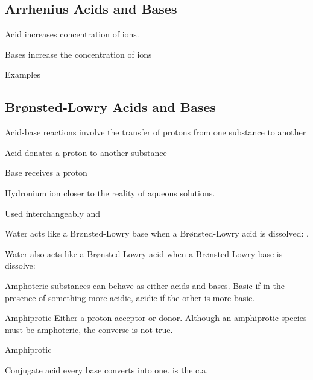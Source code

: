 \begin{mdframed}
\begin{multicols}{2}
\subsection{Arrhenius Acids and Bases}
\begin{compactdesc}
    \item[Acid] increases concentration of  ions.
    \item[Bases] increase the concentration of  ions
    \item[Examples] 
                 \\ 
\end{compactdesc}

\subsection{Br{\o}nsted-Lowry Acids and Bases}
\begin{compactdesc}
    \item[Acid-base reactions] involve the transfer of protons from one
        substance to another
    \item[Acid] donates a proton to another substance
    \item[Base] receives a proton
    \item[Hydronium ion] closer to the reality of aqueous solutions.
    \item[Used interchangeably]  and 
    \item[Water acts like] a Br{\o}nsted-Lowry base when a Br{\o}nsted-Lowry
        acid is dissolved:
        .
    \item[Water also acts like] a Br{\o}nsted-Lowry acid when a
        Br{\o}nsted-Lowry base is dissolve:
    \item[Amphoteric] substances can behave as either acids and bases.
        Basic if in the presence of something more acidic, acidic if the other
        is more basic.
    \item[Amphiprotic] Either a proton acceptor or donor. Although an
        amphiprotic species must be amphoteric, the
        converse is not true.
    \item[Amphiprotic] 
    \item[Conjugate acid] every base converts into one.  is the c.a.

\end{compactdesc}
\end{multicols}
\end{mdframed}
